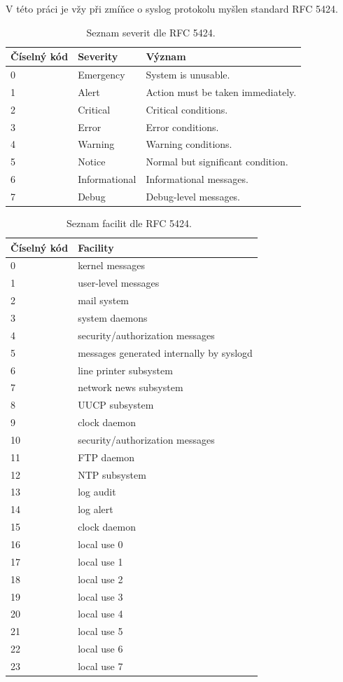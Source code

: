 \documentclass[thesis=B,czech]{FITthesis}[2012/06/26]
\begin{document}
V této práci je vžy při zmíňce o syslog protokolu myšlen standard RFC 5424.

\begin{table}[ht]
\centering
	\caption[Tabulka severit podle RFC 5424]{Seznam severit dle RFC 5424.~\cite{RFC5424}}
	\begin{tabular}{|l|l|l|}\hline
		Číselný kód	& Severity & Význam	\tabularnewline \hline \hline
		0		& Emergency	&	System is unusable. \tabularnewline \hline
		1		& Alert		&	Action must be taken immediately. \tabularnewline \hline
		2		& Critical	&	Critical conditions. \tabularnewline \hline
		3		& Error		&	Error conditions.	\tabularnewline \hline
		4		& Warning	&	Warning conditions. \tabularnewline \hline
		5		& Notice		&	Normal but significant condition. \tabularnewline \hline
		6		& Informational & Informational messages. \tabularnewline \hline
		7		& Debug		&	Debug-level messages. \tabularnewline \hline
	\end{tabular}
\end{table}

\begin{table}[ht]   %
\centering
	\caption[Tabulka facilit podle RFC 5424]{Seznam facilit dle RFC 5424.~\cite{RFC5424}}
	\begin{tabular}{|l|l|}\hline
		Číselný kód & Facility			\tabularnewline \hline \hline
		0		& kernel messages		\tabularnewline \hline
		1		& user-level messages	\tabularnewline \hline
		2		& mail system			\tabularnewline \hline
		3		& system daemons			\tabularnewline \hline
		4		& security/authorization messages			\tabularnewline \hline
		5		& messages generated internally by syslogd	\tabularnewline \hline
		6		& line printer subsystem		\tabularnewline \hline
		7		& network news subsystem		\tabularnewline \hline
		8		& UUCP subsystem			\tabularnewline \hline
		9		& clock daemon			\tabularnewline \hline
		10		& security/authorization messages			\tabularnewline \hline
		11		& FTP daemon				\tabularnewline \hline
		12		& NTP subsystem			\tabularnewline \hline
		13		& log audit				\tabularnewline \hline
		14		& log alert				\tabularnewline \hline
		15		& clock daemon			\tabularnewline \hline
		16		& local use 0			\tabularnewline \hline
		17		& local use 1			\tabularnewline \hline
		18		& local use 2			\tabularnewline \hline
		19		& local use 3			\tabularnewline \hline
		20		& local use 4			\tabularnewline \hline
		21		& local use 5			\tabularnewline \hline
		22		& local use 6			\tabularnewline \hline
		23		& local use 7			\tabularnewline \hline
	\end{tabular}
\end{table}
\end{document}
